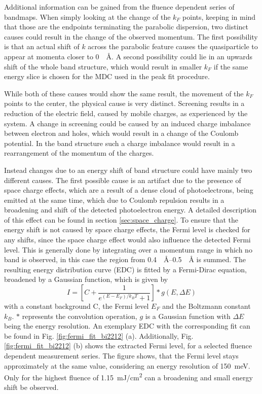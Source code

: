 Additional information can be gained from the fluence dependent series of bandmaps.
When simply looking at the change of the $k_F$ points, keeping in mind that those are the endpoints terminating the parabolic dispersion, two distinct causes could result in the change of the observed momentum.
The first possibility is that an actual shift of $k$ across the parabolic feature causes the quasiparticle to appear at momenta closer to \qty{0}{\per\angstrom}.
A second possibility could lie in an upwards shift of the whole band structure, which would result in smaller $k_F$ if the same energy slice is chosen for the MDC used in the peak fit procedure.

While both of these causes would show the same result, the movement of the $k_F$ points to the center, the physical cause is very distinct.
Screening results in a reduction of the electric field, caused by mobile charges, as experienced by the system.
A change in screening could be caused by an induced charge imbalance between electron and holes, which would result in a change of the Coulomb potential.
In the band structure such a charge imbalance would result in a rearrangement of the momentum of the charges.

Instead changes due to an energy shift of band structure could have mainly two different causes.
The first possible cause is an artifact due to the presence of space charge effects, which are a result of a dense cloud of photoelectrons, being emitted at the same time, which due to Coulomb repulsion results in a broadening and shift of the detected photoelectron energy.
A detailed description of this effect can be found in section \ref{sec:space_charge}.
To ensure that the energy shift is not caused by space charge effects, the Fermi level is checked for any shifts, since the space charge effect would also influence the detected Fermi level.
This is generally done by integrating over a momentum range in which no band is observed, in this case the region from \qtyrange{0.4}{0.5}{\per\angstrom} is summed.
The resulting energy distribution curve (EDC) is fitted by a Fermi-Dirac equation, broadened by a Gaussian function, which is given by
\begin{equation}
	I = \left[ C + \frac{1}{e^{(E-E_F)/k_BT}+1} \right] * g(E,\Delta E)
\end{equation}
with a constant background C, the Fermi level $E_F$ and the Boltzmann constant $k_B$.
$*$ represents the convolution operation, $g$ is a Gaussian function with $\Delta E$ being the energy resolution.
An exemplary EDC with the corresponding fit can be found in Fig. \ref{fig:fermi_fit_bi2212} (a).
Additionally, Fig. \ref{fig:fermi_fit_bi2212} (b) shows the extracted Fermi level, for a selected fluence dependent measurement series.
The figure shows, that the Fermi level stays approximately at the same value, considering an energy resolution of \qty{150}{\milli\electronvolt}.
Only for the highest fluence of \qty{1.15}{\milli\joule/\centi\meter\squared} can a broadening and small energy shift be observed.


